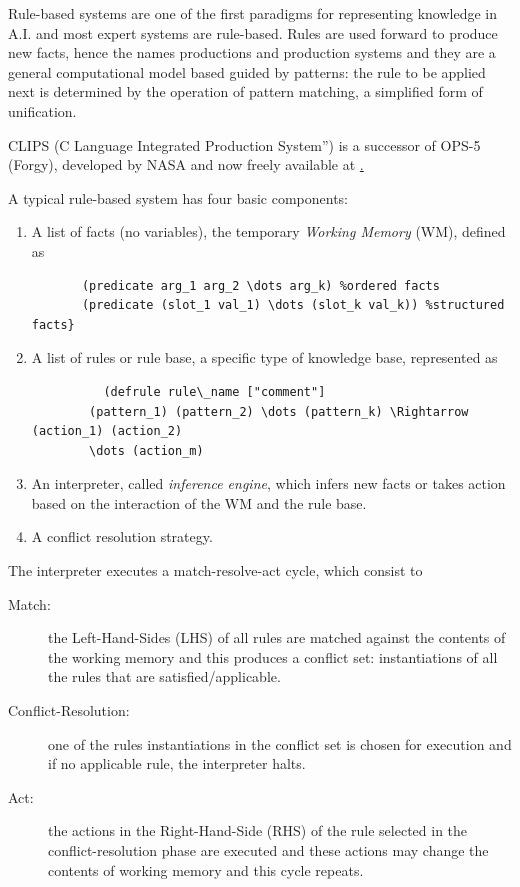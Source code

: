 Rule-based systems are one of the first paradigms for representing knowledge in A.I. and 
most expert systems are rule-based.\newline
Rules are used forward to produce new facts, hence the names productions and production systems
and they are a general computational model based guided by patterns: the rule to be applied
next is determined by the operation of pattern matching, a simplified form of unification.

CLIPS (C Language Integrated Production System”) is a successor of OPS-5 (Forgy), 
developed by NASA and now freely available at \href{http://www.clipsrules.net/}.

A typical rule-based system has four basic components:
\begin{enumerate}
   \item A list of facts (no variables), the temporary \emph{Working Memory} (WM), defined as 
	   \begin{lstlisting}
	   (predicate arg_1 arg_2 \dots arg_k) %ordered facts 
	   (predicate (slot_1 val_1) \dots (slot_k val_k)) %structured facts}
	   \end{lstlisting}
   \item A list of rules or rule base, a specific type of knowledge base, represented as 
	   \begin{lstlisting}
	      (defrule rule\_name ["comment"] 
		(pattern_1) (pattern_2) \dots (pattern_k) \Rightarrow (action_1) (action_2) 
		\dots (action_m) 
	   \end{lstlisting}
   \item An interpreter, called \emph{inference engine}, which infers new facts or takes action
	 based on the interaction of the WM and the rule base.
   \item A conflict resolution strategy.
\end{enumerate}
The interpreter executes a match-resolve-act cycle, which consist to 
\begin{description}
   \item [Match: ] the Left-Hand-Sides (LHS) of all rules are matched against the contents
	   of the working memory and this produces a conflict set: instantiations
           of all the rules that are satisfied/applicable.
   \item [Conflict-Resolution: ] one of the rules instantiations in the conflict set is
          chosen for execution and if no applicable rule, the interpreter halts.
   \item [Act: ] the actions in the Right-Hand-Side (RHS) of the rule selected in the
          conflict-resolution phase are executed and these actions may change the
          contents of working memory and this cycle repeats.
\end{description}
